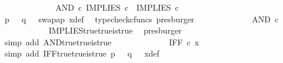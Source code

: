 \begin{isabellebody}
\ \ \ \ \ \ \ \ \isamarkupfalse%
\ \isamarkupfalse%
\ {\isachardoublequoteopen}{\isachardot}{\kern0pt}{\isachardot}{\kern0pt}{\isachardot}{\kern0pt}\ {\isacharequal}{\kern0pt}\ AND\ {\isasymcirc}\isactrlsub c\ {\isasymlangle}IMPLIES\ {\isasymcirc}\isactrlsub c\ {\isasymlangle}{\isasymt}{\isacharcomma}{\kern0pt}{\isasymt}{\isasymrangle}{\isacharcomma}{\kern0pt}\ IMPLIES\ {\isasymcirc}\isactrlsub c\ {\isasymlangle}{\isasymt}{\isacharcomma}{\kern0pt}{\isasymt}{\isasymrangle}{\isasymrangle}{\isachardoublequoteclose}\isanewline
\ \ \ \ \ \ \ \ \ \ \isamarkupfalse%
\ {\isacartoucheopen}p\ {\isacharequal}{\kern0pt}\ {\isasymt}{\isacartoucheclose}\ {\isacartoucheopen}q\ {\isacharequal}{\kern0pt}\ {\isasymt}{\isacartoucheclose}\ swap{\isacharunderscore}{\kern0pt}ap\ x{\isacharunderscore}{\kern0pt}def\ \isamarkupfalse%
\ {\isacharparenleft}{\kern0pt}typecheck{\isacharunderscore}{\kern0pt}cfuncs{\isacharcomma}{\kern0pt}\ presburger{\isacharparenright}{\kern0pt}\isanewline
\ \ \ \ \ \ \ \ \isamarkupfalse%
\ \isamarkupfalse%
\ {\isachardoublequoteopen}{\isachardot}{\kern0pt}{\isachardot}{\kern0pt}{\isachardot}{\kern0pt}\ {\isacharequal}{\kern0pt}\ AND\ {\isasymcirc}\isactrlsub c\ {\isasymlangle}{\isasymt}{\isacharcomma}{\kern0pt}\ {\isasymt}{\isasymrangle}{\isachardoublequoteclose}\isanewline
\ \ \ \ \ \ \ \ \ \ \isamarkupfalse%
\ IMPLIES{\isacharunderscore}{\kern0pt}true{\isacharunderscore}{\kern0pt}true{\isacharunderscore}{\kern0pt}is{\isacharunderscore}{\kern0pt}true\ \isamarkupfalse%
\ presburger\isanewline
\ \ \ \ \ \ \ \ \isamarkupfalse%
\ \isamarkupfalse%
\ {\isachardoublequoteopen}{\isachardot}{\kern0pt}{\isachardot}{\kern0pt}{\isachardot}{\kern0pt}\ {\isacharequal}{\kern0pt}\ {\isasymt}{\isachardoublequoteclose}\isanewline
\ \ \ \ \ \ \ \ \ \ \isamarkupfalse%
\ {\isacharparenleft}{\kern0pt}simp\ add{\isacharcolon}{\kern0pt}\ AND{\isacharunderscore}{\kern0pt}true{\isacharunderscore}{\kern0pt}true{\isacharunderscore}{\kern0pt}is{\isacharunderscore}{\kern0pt}true{\isacharparenright}{\kern0pt}\isanewline
\ \ \ \ \ \ \ \ \isamarkupfalse%
\ \isamarkupfalse%
\ {\isachardoublequoteopen}{\isachardot}{\kern0pt}{\isachardot}{\kern0pt}{\isachardot}{\kern0pt}\ {\isacharequal}{\kern0pt}\ IFF\ {\isasymcirc}\isactrlsub c\ x{\isachardoublequoteclose}\isanewline
\ \ \ \ \ \ \ \ \ \ \isamarkupfalse%
\ {\isacharparenleft}{\kern0pt}simp\ add{\isacharcolon}{\kern0pt}\ IFF{\isacharunderscore}{\kern0pt}true{\isacharunderscore}{\kern0pt}true{\isacharunderscore}{\kern0pt}is{\isacharunderscore}{\kern0pt}true\ {\isacartoucheopen}p\ {\isacharequal}{\kern0pt}\ {\isasymt}{\isacartoucheclose}\ {\isacartoucheopen}q\ {\isacharequal}{\kern0pt}\ {\isasymt}{\isacartoucheclose}\ x{\isacharunderscore}{\kern0pt}def{\isacharparenright}{\kern0pt}\isanewline

\end{isabellebody}
